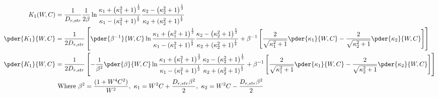     \begin{equation}
    \begin{split}
    K_1(W,C) & =  \frac{1}{D_{r,str}} \frac{1}{2\beta}  \ln{\frac{ \kappa_{1} + \left(\kappa_{1}^2+1\right)^{\frac{1}{2}}}{\kappa_{1} - \left(\kappa_{1}^2+1\right)^{\frac{1}{2}}} \frac{\kappa_{2} - \left(\kappa_{2}^2+1\right)^{\frac{1}{2}}}{\kappa_{2} + \left(\kappa_{2}^2+1\right)^{\frac{1}{2}}}}\\
    \pder{K_1}{W,C} & =  \frac{1}{2 D_{r,str}} \left[ \pder{\beta^{-1}}{W,C} \ln{\frac{\kappa_{1} + \left(\kappa_{1}^2+1\right)^{\frac{1}{2}}}{\kappa_{1} - \left(\kappa_{1}^2+1\right)^{\frac{1}{2}}} \frac{\kappa_{2} - \left(\kappa_{2}^2+1\right)^{\frac{1}{2}}}{\kappa_{2} + \left(\kappa_{2}^2+1\right)^{\frac{1}{2}}}} + \beta^{-1} \left[ \frac{2}{\sqrt{\kappa_1^2 + 1}}\pder{\kappa_1}{W,C} - \frac{2}{\sqrt{\kappa_2^2 + 1}}\pder{\kappa_2}{W,C}\right] \right]\\
    \pder{K_1}{W,C} & =  \frac{1}{2 D_{r,str}} \left[ -\frac{1}{\beta^2}\pder{\beta}{W,C} \ln{\frac{\kappa_{1} + \left(\kappa_{1}^2+1\right)^{\frac{1}{2}}}{\kappa_{1} - \left(\kappa_{1}^2+1\right)^{\frac{1}{2}}} \frac{\kappa_{2} - \left(\kappa_{2}^2+1\right)^{\frac{1}{2}}}{\kappa_{2} + \left(\kappa_{2}^2+1\right)^{\frac{1}{2}}}} + \beta^{-1} \left[ \frac{2}{\sqrt{\kappa_1^2 + 1}}\pder{\kappa_1}{W,C} - \frac{2}{\sqrt{\kappa_2^2 + 1}}\pder{\kappa_2}{W,C}\right] \right]\\
    &\mbox{ Where } \beta^2 = \frac{(1+W^4C^2)}{W^2},\ \kappa_1 = W^2C + \frac{D_{r,str}\beta^2}{2},\ \kappa_2 = W^2C - \frac{D_{r,str}\beta^2}{2} \\
    \end{split}
    \end{equation}